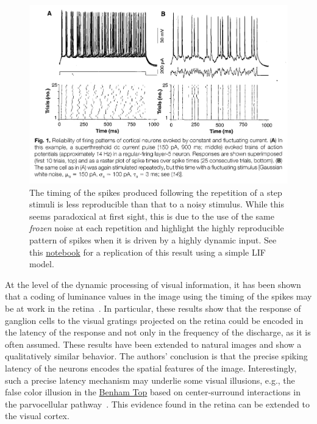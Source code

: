 \documentclass[brainsci, %
               review,submit,pdftex,moreauthors
               ]{Definitions/mdpi}
\begin{document}
\begin{figure}
\centering
\includegraphics[width=.7\textwidth]{figures/MainenSejnowski1995.png} %
\caption{The timing of the spikes produced following the repetition of a step stimuli is less reproducible than that to a noisy stimulus. While this seems paradoxical at first sight, this is due to the use of the same \emph{frozen} noise at each repetition and highlight the highly reproducible pattern of spikes when it is driven by a highly dynamic input. See this \href{https://github.com/laurentperrinet/2022_UE-neurosciences-computationnelles/blob/master/C_MainenSejnowski1995.ipynb}{notebook} for a replication of this result using a simple LIF model.}\label{fig:mainen}
\end{figure}

At the level of the dynamic processing of visual information, it has been shown that a coding of luminance values in the image using the timing of the spikes may be at work in the retina~\citep{gollisch_rapid_2008}. In particular, these results show that the response of ganglion cells to the visual gratings projected on the retina could be encoded in the latency of the response and not only in the frequency of the discharge, as it is often assumed. These results have been extended to natural images and show a qualitatively similar behavior. The authors' conclusion is that the precise spiking latency of the neurons encodes the spatial features of the image. Interestingly, such a precise latency mechanism may underlie some visual illusions, e.g., the false color illusion in the \href{https://michaelbach.de/ot/col-Benham/index.html}{Benham Top} based on center-surround interactions in the parvocellular pathway~\citep{kenyon_theory_2004}. This evidence found in the retina  can be extended to the visual cortex.
\end{document}
